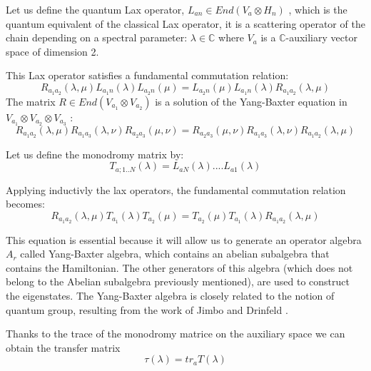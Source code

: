 \documentclass[12pt]{article}
\begin{document}
Let us define the quantum Lax operator,  $L_{an}\in End(V_{a}\otimes H_n)$ , which is the quantum equivalent of the classical Lax operator, it is a scattering operator of the chain depending on a spectral parameter: $\lambda \in \mathbb{C} $ %
where $V_{a}$ is a $\mathbb{C}$-auxiliary vector space of dimension 2.

This Lax operator satisfies a fundamental commutation relation:
\begin{equation}
R_{a_{1}a_{2}}(\lambda ,\mu)L_{a_{1}n}(\lambda )L_{a_{2}n}(\mu )=L_{a_{2}n}(\mu)L_{a_{1}n}(\lambda )R_{a_{1}a_{2}}(\lambda ,\mu )
\end{equation}
The matrix $R\in End(V_{a_{1}}\otimes V_{a_{2}})$ is a solution of the Yang-Baxter equation in 
 $V_{a_{1}}\otimes V_{a_{2}}\otimes V_{a_{3}}$ :
 \begin{equation}
 R_{a_{1}a_{2}}(\lambda,\mu)R_{a_{1}a_{3}}(\lambda,\nu)R_{a_{2}a_{3}}(\mu ,\nu)=R_{a_{2}a_{3}}(\mu,\nu)R_{a_{1}a_{3}}(\lambda,\nu)R_{a_{1}a_{2}}(\lambda,\mu)
\end{equation}

Let us define the monodromy matrix by:
\begin{equation}
T_{a;1..N}(\lambda)=L_{aN}(\lambda)....L_{a1}(\lambda)
\end{equation}

Applying inductivly the lax operators, the fundamental commutation relation becomes:\begin{equation}
R_{a_{1}a_{2}}(\lambda,\mu)T_{a_{1}}(\lambda)T_{a_{2}}(\mu)=T_{a_{2}}(\mu)T_{a_{1}}(\lambda)R_{a_{1}a_{2}}(\lambda,\mu)
\end{equation}

This equation is essential because it will allow us to generate an operator algebra $A_r$ called Yang-Baxter algebra, which contains an abelian subalgebra that contains the Hamiltonian. The other generators of this algebra (which does not belong to the Abelian subalgebra previously mentioned), are used to construct the eigenstates. The Yang-Baxter algebra is closely related to the notion of quantum group, resulting from the work of Jimbo \cite {Jim92} and Drinfeld \cite{Dri87}.

Thanks to the trace of the monodromy matrice on the auxiliary space we can obtain the transfer matrix $$\tau(\lambda)=tr_{a}T(\lambda)$$
\end{document}

